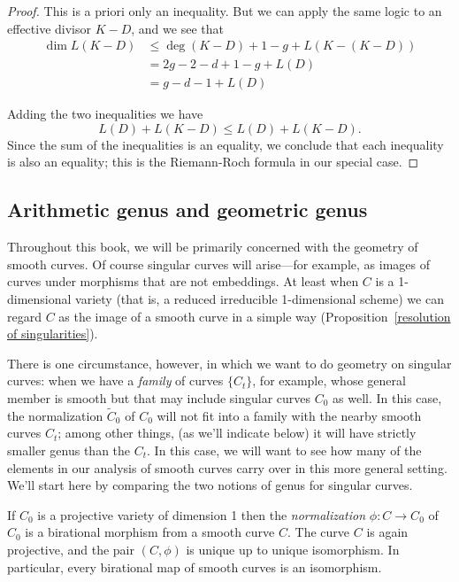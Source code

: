 \begin{proof}
This is a priori only an inequality. But we can apply the same logic to an effective divisor $K-D$, and we see that
\begin{align*}
\dim L(K-D) &\leq \deg(K-D) + 1 - g + L(K - (K-D)) \\
& = 2g - 2 - d + 1 - g  + L(D) \\
&= g - d - 1 + L(D)
\end{align*}

Adding the two inequalities we have
$$
L(D) + L(K-D) \leq L(D) + L(K-D).
$$
Since the sum of the inequalities is an equality, we conclude that each inequality is also an equality; this is the Riemann-Roch formula
in our special case.
\end{proof}

\subsection{Arithmetic genus and geometric genus}

Throughout this book, we will be primarily concerned with the geometry of smooth curves. Of course singular curves will arise---for example, as images of curves under morphisms that are not embeddings. At least when $C$ is a 1-dimensional variety (that is, a 
reduced irreducible 1-dimensional scheme) we can regard $C$ as the image of a smooth curve in a simple way (Proposition~\ref{resolution of singularities}).

There is one circumstance, however, in which we want to do geometry on singular curves: when we have a \emph{family} of curves $\{C_t\}$, for example, whose general member is smooth but that may include singular curves $C_0$ as well. In this case, the  normalization $\tilde C_0$ of $C_0$ will not fit into a family with the nearby smooth curves $C_t$; among other things, (as we'll indicate below) it will have strictly smaller genus than the $C_t$. In this case, we will want to see how many of the elements in our analysis of smooth curves carry over in this more general setting. We'll start here by comparing the two notions of genus for singular curves.



\begin{proposition}\label{resolution of singularities}
If $C_0$ is a projective variety of dimension 1 then the \emph{normalization} $\phi: C \to C_0$ of $C_0$ is a birational
morphism from a smooth curve $C$. The curve $C$ is again projective, and the pair $(C, \phi)$ is
unique up to unique isomorphism. In particular, every birational map of smooth curves is an isomorphism.
\end{proposition}
 
